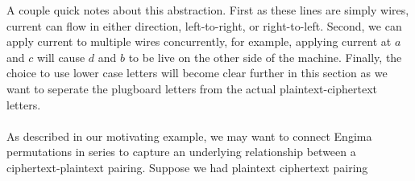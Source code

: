     \begin{center}
    \end{center}
    A couple quick notes about this abstraction. First as these lines are simply wires, current can flow in either direction, left-to-right, or right-to-left. 
    Second, we can apply current to multiple wires concurrently, for example, applying current at $a$ and $c$ will cause $d$ and $b$ to be live on the other side of the machine.
    Finally, the choice to use lower case letters will become clear further in this section as we want to seperate the plugboard letters from the actual plaintext-ciphertext letters. 
    \\\\As described in our motivating example, we may want to connect Engima permutations in series to capture an underlying relationship between a ciphertext-plaintext pairing. 
    Suppose we had plaintext ciphertext pairing 
